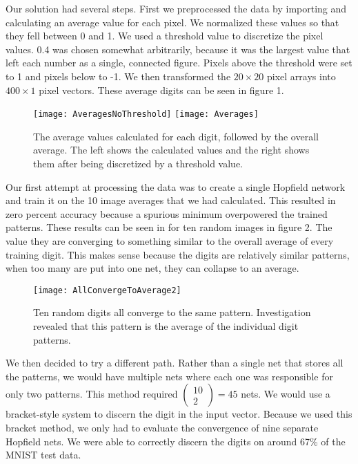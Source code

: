 \documentclass[]{article}
\theoremstyle{plain}
\theoremstyle{definition}
\begin{document}
\quad Our solution had several steps. First we preprocessed the data by importing and calculating an average value for each pixel. We normalized these values so that they fell between 0 and 1. We used a threshold value to discretize the pixel values. 0.4 was chosen somewhat arbitrarily, because it was the largest value that left each number as a single, connected figure. Pixels above the threshold were set to 1 and pixels below to -1. We then transformed the $ 20\times20 $ pixel arrays into $ 400\times 1 $ pixel vectors. These average digits can be seen in figure 1. 

\begin{figure}[h]
\centering
\texttt{[image: AveragesNoThreshold]}
\texttt{[image: Averages]}
\caption{The average values calculated for each digit, followed by the overall average. The left shows the calculated values and the right shows them after being discretized by a threshold value.}
\end{figure}
Our first attempt at processing the data was to create a single Hopfield network and train it on the 10 image averages that we had calculated. This resulted in zero percent accuracy because a spurious minimum overpowered the trained patterns. These results can be seen in for ten random images in figure 2. The value they are converging to something similar to the overall average of every training digit. This makes sense because the digits are relatively similar patterns, when too many are put into one net, they can collapse to an average. 

\begin{figure}[h]
\centering
\texttt{[image: AllConvergeToAverage2]}
\caption{Ten random digits all converge to the same pattern. Investigation revealed that this pattern is the average of the individual digit patterns.}
\end{figure}

We then decided to try a different path. Rather than a single net that stores all the patterns, we would have multiple nets where each one was responsible for only two patterns. This method required $ \left(\begin{array}{c}
10\\2
\end{array}\right) = 45 $ nets. We would use a bracket-style system to discern the digit in the input vector. Because we used this bracket method, we only had to evaluate the convergence of nine separate Hopfield nets. We were able to correctly discern the digits on around 67\% of the MNIST test data. 
\end{document}
